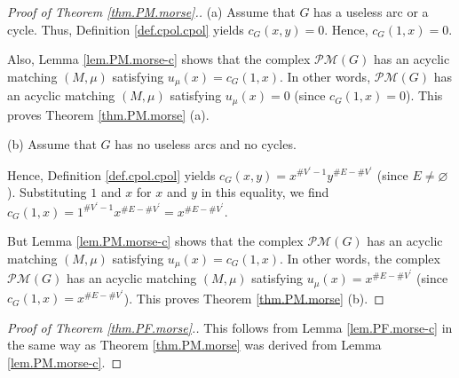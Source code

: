 \documentclass[12pt]{amsart}
\theoremstyle{definition}
\newcommand{\Pm}[1]{\mathcal{PM}\left(#1\right)}
\newcommand{\NS}{V^{\prime}}
\begin{document}
\begin{proof}
[Proof of Theorem \ref{thm.PM.morse}.] (a) Assume that $G$ has a useless arc
or a cycle. Thus, Definition \ref{def.cpol.cpol} yields $c_{G}\left(
x,y\right)  =0$. Hence, $c_{G}\left(  1,x\right)  =0$.

Also, Lemma \ref{lem.PM.morse-c} shows that the complex
$\Pm{G}$ has an acyclic matching $\left(
M,\mu\right)  $ satisfying $u_{\mu}\left(  x\right)  =c_{G}\left(  1,x\right)
$. In other words, $\Pm{G}$ has an acyclic matching
$\left(  M,\mu\right)  $ satisfying $u_{\mu}\left(  x\right)  =0$ (since
$c_{G}\left(  1,x\right)  =0$). This proves Theorem \ref{thm.PM.morse} (a).

(b) Assume that $G$ has no useless arcs and no cycles.



Hence, Definition \ref{def.cpol.cpol} yields
$c_{G}\left(  x,y\right)  =x^{\#\NS -1}y^{\#E-\#\NS}$ (since
$E \neq \varnothing$). Substituting $1$ and $x$ for $x$ and $y$
in this equality, we find $c_{G}\left(  1,x\right)  =1^{\#\NS%
-1}x^{\#E-\#\NS}=x^{\#E-\#\NS}$.

But Lemma \ref{lem.PM.morse-c} shows that the complex $\Pm{G}$ has an acyclic matching $\left(  M,\mu\right)  $ satisfying
$u_{\mu}\left(  x\right)  =c_{G}\left(  1,x\right)  $. In other words, the
complex $\Pm{G}$ has an acyclic matching $\left(
M,\mu\right)  $ satisfying $u_{\mu}\left(  x\right)  =x^{\#E-\#\NS}$
(since $c_{G}\left(  1,x\right)  =x^{\#E-\#\NS}$). This proves Theorem
\ref{thm.PM.morse} (b).
\end{proof}



\begin{proof}
[Proof of Theorem \ref{thm.PF.morse}.] This follows from Lemma
\ref{lem.PF.morse-c} in the same way as Theorem \ref{thm.PM.morse} was derived
from Lemma \ref{lem.PM.morse-c}.
\end{proof}
\end{document}
